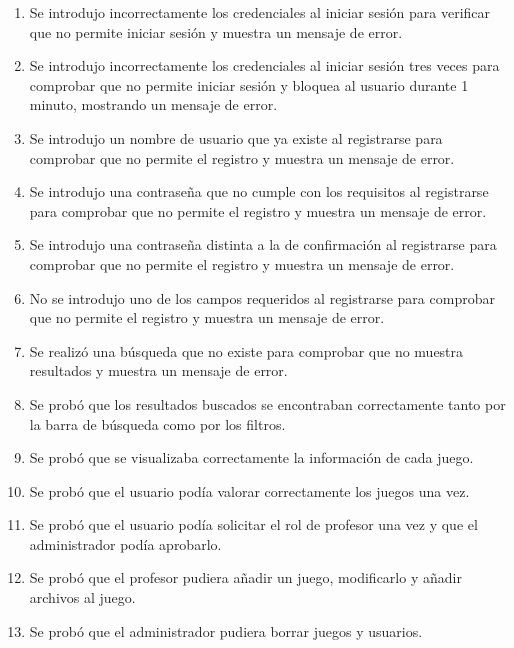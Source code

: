 \begin{enumerate}
    \item Se introdujo incorrectamente los credenciales al iniciar sesión para verificar que no permite iniciar sesión y muestra un mensaje de error.
    \item Se introdujo incorrectamente los credenciales al iniciar sesión tres veces para comprobar que no permite iniciar sesión y bloquea al usuario durante 1 minuto, mostrando un mensaje de error.
    \item Se introdujo un nombre de usuario que ya existe al registrarse para comprobar que no permite el registro y muestra un mensaje de error.
    \item Se introdujo una contraseña que no cumple con los requisitos al registrarse para comprobar que no permite el registro y muestra un mensaje de error.
    \item Se introdujo una contraseña distinta a la de confirmación al registrarse para comprobar que no permite el registro y muestra un mensaje de error.
    \item No se introdujo uno de los campos requeridos al registrarse para comprobar que no permite el registro y muestra un mensaje de error.
    \item Se realizó una búsqueda que no existe para comprobar que no muestra resultados y muestra un mensaje de error.
    \item Se probó que los resultados buscados se encontraban correctamente tanto por la barra de búsqueda como por los filtros.
    \item Se probó que se visualizaba correctamente la información de cada juego.
    \item Se probó que el usuario podía valorar correctamente los juegos una vez.
    \item Se probó que el usuario podía solicitar el rol de profesor una vez y que el administrador podía aprobarlo.
    \item Se probó que el profesor pudiera añadir un juego, modificarlo y añadir archivos al juego.
    \item Se probó que el administrador pudiera borrar juegos y usuarios.
\end{enumerate}


